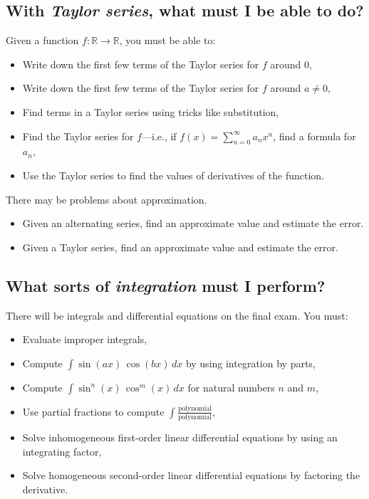 \documentclass[12pt]{article}
\theoremstyle{definition}
\newcommand{\R}{\mathbb{R}}
\begin{document}
\subsection*{With \textit{Taylor series}, what must I be able to do?}

Given a function $f : \R \to \R$, you must be able to:
\begin{itemize}
\item Write down the first few terms of the Taylor series for $f$ around $0$,
\item Write down the first few terms of the Taylor series for $f$ around $a \neq 0$,
\item Find terms in a Taylor series using tricks like substitution,
\item Find the Taylor series for $f$---i.e., if $f(x) = \sum_{n=0}^\infty a_n x^n$, find a formula for $a_n$,
\item Use the Taylor series to find the values of derivatives of the function.
\end{itemize}
\noindent
There may be problems about approximation.
\begin{itemize}
\item Given an alternating series, find an approximate value and estimate the error.
\item Given a Taylor series, find an approximate value and estimate the error.
\end{itemize}

\subsection*{What sorts of \textit{integration} must I perform?}

There will be integrals and differential equations on the final exam.  You must:
\begin{itemize}
\item Evaluate improper integrals,
\item Compute $\int \sin(ax) \, \cos(bx) \, dx$ by using integration by parts,
\item Compute $\int \sin^n (x) \, \cos^m (x) \, dx$ for natural numbers $n$ and $m$,
\item Use partial fractions to compute $\displaystyle\int \frac{\mbox{polynomial}}{\mbox{polynomial}}$,
\item Solve inhomogeneous first-order linear differential equations by using an integrating factor,
\item Solve homogeneous second-order linear differential equations by factoring the derivative.
\end{itemize}
\end{document}
